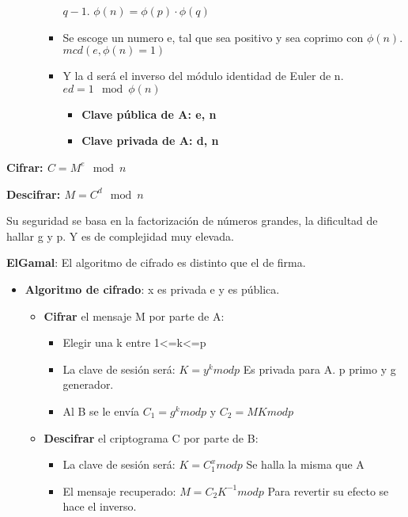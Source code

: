 \documentclass[12pt, twoside, openright]{report} %
\begin{document}
\begin{itemize}
\begin{itemize}
\begin{itemize}
			                  $q-1$. $\phi(n) = \phi(p)\cdot\phi(q)$
			            \item Se escoge un numero e, tal que sea positivo y sea coprimo con
			                  $\phi (n)$. $mcd(e, \phi(n)=1)$
			            \item Y la d será el inverso del módulo identidad de Euler de n.
			                  $ed = 1 \mod \phi (n)$
			                  \begin{itemize}
				                  \item \textbf{Clave pública de A: e, n}
				                  \item \textbf{Clave privada de A: d, n}
			                  \end{itemize}
		            \end{itemize}
	      \end{itemize}
\end{itemize}

\textbf{Cifrar: $C=M^e \mod n$}

\textbf{Descifrar: $M=C^d \mod n$}

Su seguridad se basa en la factorización de números grandes, la dificultad de hallar g y p. Y es de complejidad muy elevada.

\textbf{ElGamal}: El algoritmo de cifrado es distinto que el de firma.

\begin{itemize}
	\item \textbf{Algoritmo de cifrado}: x es privada e y es pública.
	      \begin{itemize}
		      \item \textbf{Cifrar} el mensaje M por parte de A:
		            \begin{itemize}
			            \item Elegir una k entre 1\textless=k\textless=p
			            \item La clave de sesión será: $K=y^k mod p$ Es privada para A. p primo y g generador.
			            \item Al B se le envía $C_1 = g^k mod p$ y $C_2 = M K mod p$
		            \end{itemize}
		      \item \textbf{Descifrar} el criptograma C por parte de B:
		            \begin{itemize}
			            \item La clave de sesión será: $K=C_1^x mod p$ Se halla la misma que A
			            \item El mensaje recuperado: $M=C_2 K^{-1} mod p$ Para revertir su efecto se hace el inverso.
		            \end{itemize}
	      \end{itemize}
\end{itemize}
\end{document}
